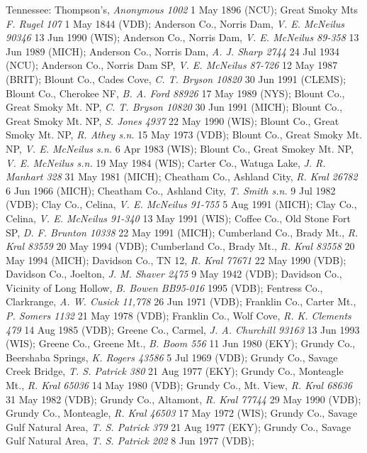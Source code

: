 \documentclass{article}
\begin{document}
Tennessee:
Thompson's, \textit{Anonymous 1002} 1 May 1896 (NCU);
Great Smoky Mts \textit{F. Rugel 107} 1 May 1844 (VDB);
Anderson Co., Norris Dam, \textit{V. E. McNeilus 90346} 13 Jun 1990 (WIS);
Anderson Co.,  Norris Dam, \textit{V. E. McNeilus 89-358} 13 Jun 1989 (MICH);
Anderson Co., Norris Dam, \textit{A. J. Sharp 2744} 24 Jul 1934 (NCU);
Anderson Co., Norris Dam SP, \textit{V. E. McNeilus 87-726} 12 May 1987 (BRIT);
Blount Co., Cades Cove, \textit{C. T. Bryson 10820} 30 Jun 1991 (CLEMS);
Blount Co., Cherokee NF, \textit{B. A. Ford 88926} 17 May 1989 (NYS);
Blount Co., Great Smoky Mt. NP, \textit{C. T. Bryson 10820} 30 Jun 1991 (MICH);
Blount Co., Great Smoky Mt. NP, \textit{S. Jones 4937} 22 May 1990 (WIS);
Blount Co., Great Smoky Mt. NP, \textit{R. Athey s.n.} 15 May 1973 (VDB);
Blount Co., Great Smoky Mt. NP, \textit{V. E. McNeilus s.n.} 6 Apr 1983 (WIS);
Blount Co., Great Smokey Mt. NP, \textit{V. E. McNeilus s.n.} 19 May 1984 (WIS);
Carter Co., Watuga Lake, \textit{J. R. Manhart 328} 31 May 1981 (MICH);
Cheatham Co., Ashland City, \textit{R. Kral 26782} 6 Jun 1966 (MICH);
Cheatham Co., Ashland City, \textit{T. Smith s.n.} 9 Jul 1982 (VDB);
Clay Co., Celina, \textit{V. E. McNeilus 91-755} 5 Aug 1991 (MICH);
Clay Co., Celina, \textit{V. E. McNeilus 91-340} 13 May 1991 (WIS);
Coffee Co., Old Stone Fort SP, \textit{D. F. Brunton 10338} 22 May 1991 (MICH);
Cumberland Co., Brady Mt., \textit{R. Kral 83559} 20 May 1994 (VDB);
Cumberland Co., Brady Mt., \textit{R. Kral 83558} 20 May 1994 (MICH);
Davidson Co., TN 12, \textit{R. Kral 77671} 22 May 1990 (VDB);
Davidson Co., Joelton, \textit{J. M. Shaver 2475} 9 May 1942 (VDB);
Davidson Co., Vicinity of Long Hollow, \textit{B. Bowen BB95-016} 1995 (VDB);
Fentress Co., Clarkrange, \textit{A. W. Cusick 11,778} 26 Jun 1971 (VDB);
Franklin Co., Carter Mt., \textit{P. Somers 1132} 21 May 1978 (VDB);
Franklin Co., Wolf Cove, \textit{R. K. Clements 479} 14 Aug 1985 (VDB);
Greene Co., Carmel, \textit{J. A. Churchill 93163} 13 Jun 1993 (WIS);
Greene Co., Greene Mt., \textit{B. Boom 556} 11 Jun 1980 (EKY);
Grundy Co., Beershaba Springs, \textit{K. Rogers 43586} 5 Jul 1969 (VDB);
Grundy Co., Savage Creek Bridge, \textit{T. S. Patrick 380} 21 Aug 1977 (EKY);
Grundy Co., Monteagle Mt., \textit{R. Kral 65036} 14 May 1980 (VDB);
Grundy Co., Mt. View, \textit{R. Kral 68636} 31 May 1982 (VDB);
Grundy Co., Altamont, \textit{R. Kral 77744} 29 May 1990 (VDB);
Grundy Co., Monteagle, \textit{R. Kral 46503} 17 May 1972 (WIS);
Grundy Co., Savage Gulf Natural Area, \textit{T. S. Patrick 379} 21 Aug 1977 (EKY);
Grundy Co., Savage Gulf Natural Area, \textit{T. S. Patrick 202} 8 Jun 1977 (VDB);
\end{document}
